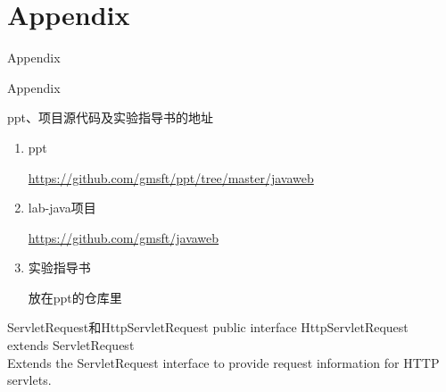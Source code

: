\documentclass{beamer}
\begin{document}
\section{Appendix}

\begin{frame}
\Huge{\centerline{Appendix}}
\end{frame}
\begin{frame}{Appendix}
\begin{block}{ppt、项目源代码及实验指导书的地址}
\begin{enumerate}
\item
ppt

\url{https://github.com/gmsft/ppt/tree/master/javaweb}
\item
lab-java项目

\url{https://github.com/gmsft/javaweb}

\item
实验指导书

放在ppt的仓库里
\end{enumerate}
\end{block}
\end{frame}

\begin{frame}{ServletRequest和HttpServletRequest}
public interface HttpServletRequest\\
extends ServletRequest\\
Extends the ServletRequest interface to provide request information for HTTP servlets.
\end{frame}

\end{document}
